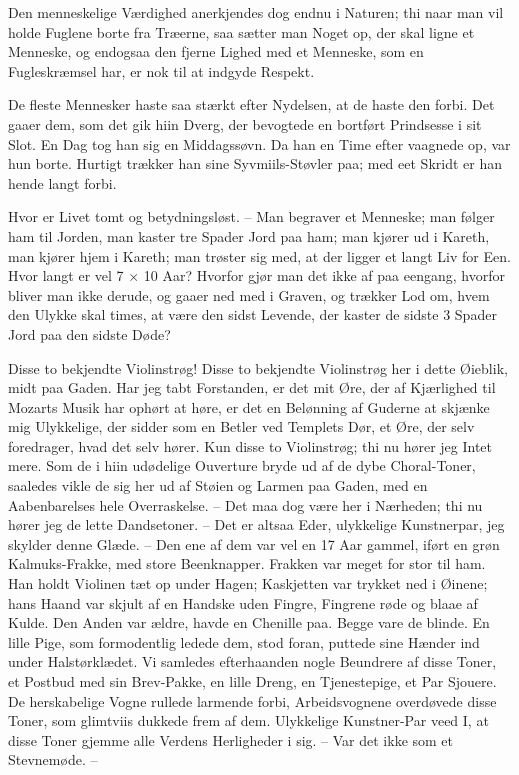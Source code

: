 \documentclass[12pt,a4paper]{article}
\begin{document}
Den menneskelige Værdighed anerkjendes dog endnu i Naturen; thi naar man vil holde Fuglene borte fra Træerne, saa sætter man Noget op, der skal ligne et Menneske, og endogsaa den fjerne Lighed med et Menneske, som en Fugleskræmsel har, er nok til at indgyde Respekt.

De fleste Mennesker haste saa stærkt efter Nydelsen, at de haste den forbi. Det gaaer dem, som det gik hiin Dverg, der bevogtede en bortført Prindsesse i sit Slot. En Dag tog han sig en Middagssøvn. Da han en Time efter vaagnede op, var hun borte. Hurtigt trækker han sine Syvmiils-Støvler paa; med eet Skridt er han hende langt forbi.

Hvor er Livet tomt og betydningsløst. – Man begraver et Menneske; man følger ham til Jorden, man kaster tre Spader Jord paa ham; man kjører ud i Kareth, man kjører hjem i Kareth; man trøster sig med, at der ligger et langt Liv for Een. Hvor langt er vel 7 × 10 Aar? Hvorfor gjør man det ikke af paa eengang, hvorfor bliver man ikke derude, og gaaer ned med i Graven, og trækker Lod om, hvem den Ulykke skal times, at være den sidst Levende, der kaster de sidste 3 Spader Jord paa den sidste Døde?

Disse to bekjendte Violinstrøg! Disse to bekjendte Violinstrøg her i dette Øieblik, midt paa Gaden. Har jeg tabt Forstanden, er det mit Øre, der af Kjærlighed til Mozarts Musik har ophørt at høre, er det en Belønning af Guderne at skjænke mig Ulykkelige, der sidder som en Betler ved Templets Dør, et Øre, der selv foredrager, hvad det selv hører. Kun disse to Violinstrøg; thi nu hører jeg Intet mere. Som de i hiin udødelige Ouverture bryde ud af de dybe Choral-Toner, saaledes vikle de sig her ud af Støien og Larmen paa Gaden, med en Aabenbarelses hele Overraskelse. – Det maa dog være her i Nærheden; thi nu hører jeg de lette Dandsetoner. – Det er altsaa Eder, ulykkelige Kunstnerpar, jeg skylder denne Glæde. – Den ene af dem var vel en 17 Aar gammel, iført en grøn Kalmuks-Frakke, med store Beenknapper. Frakken var meget for stor til ham. Han holdt Violinen tæt op under Hagen; Kaskjetten var trykket ned i Øinene; hans Haand var skjult af en Handske uden Fingre, Fingrene røde og blaae af Kulde. Den Anden var ældre, havde en Chenille paa. Begge vare de blinde. En lille Pige, som formodentlig ledede dem, stod foran, puttede sine Hænder ind under Halstørklædet. Vi samledes efterhaanden nogle Beundrere af disse Toner, et Postbud med sin Brev-Pakke, en lille Dreng, en Tjenestepige, et Par Sjouere. De herskabelige Vogne rullede larmende forbi, Arbeidsvognene overdøvede disse Toner, som glimtviis dukkede frem af dem. Ulykkelige Kunstner-Par veed I, at disse Toner gjemme alle Verdens Herligheder i sig. – Var det ikke som et Stevnemøde. –
\end{document}
